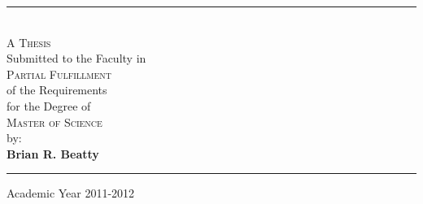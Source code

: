 \begin{titlepage}
\begin{centering}
\end{centering}
\rule{\linewidth}{0.5mm}\vspace{0.3cm}
\begin{centering}\\
  {\small{\Large\scshape A Thesis}\\Submitted to the Faculty in\\{\Large\scshape Partial Fulfillment}\\of the Requirements\\
  	for the Degree of\\{\Large\scshape Master of Science}\\by:\\}
  \vspace*{0.5em}\textbf{\LARGE Brian R. Beatty}\vspace*{0.5em}
\rule{\linewidth}{0.5mm}

\end{centering}
\begin{center}
  Academic Year 2011-2012
\end{center} \clearpage

\end{titlepage}